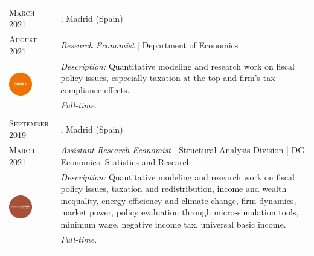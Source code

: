 \begin{longtable}{R{2.5cm}|p{14.8cm}}
 	 	\textsc{March 2021} & \textsc{}, \faMapMarker \hspace{0.5 mm} Madrid (Spain) \\
 	\textsc{August 2021} 	& \textit{Research Economist} | Department of Economics \\
	 & 
 	\footnotesize{\faTasks \emph{ Description: }Quantitative modeling and research work on fiscal policy issues, especially taxation at the top and firm’s tax compliance effects.} \\ &
	\footnotesize{\faFileText \emph{ Full-time}}. \\
 	 \\
	
 	 	\textsc{September 2019} & \textsc{}, \faMapMarker \hspace{0.5 mm} Madrid (Spain) \\
 	\textsc{March 2021} 	& \textit{Assistant Research Economist} | Structural Analysis Division | DG Economics, Statistics and Research  \\
	 & 
 	\footnotesize{\faTasks \emph{ Description: }Quantitative modeling and research work on fiscal policy issues, taxation and redistribution, income and wealth inequality, energy efficiency and climate change, firm dynamics, market power, policy evaluation through micro-simulation tools, minimum wage, negative income tax, universal basic income.} \\ &
	\footnotesize{\faFileText \emph{ Full-time}.} \\
 	 \\
	

\end{longtable}
